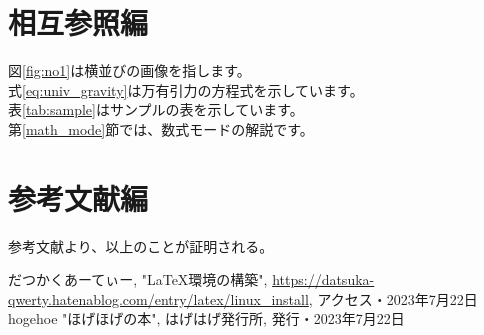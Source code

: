 \documentclass[a4j,uplatex, fleqn]{jsarticle} %
\numberwithin{equation}{section}
\begin{document}
	\section{相互参照編}
		図\ref{fig:no1}は横並びの画像を指します。 \\
		式\ref{eq:univ_gravity}は万有引力の方程式を示しています。\\
		表\ref{tab:sample}はサンプルの表を示しています。 \\
		第\ref{math_mode}節では、数式モードの解説です。
	\section{参考文献編}
		参考文献\cite{my_blog}より、以上のことが証明される。
	\begin{thebibliography}{99}
		 だつかくあーてぃー, "LaTeX環境の構築", \url{https://datsuka-qwerty.hatenablog.com/entry/latex/linux_install}, アクセス・2023年7月22日
		 hogehoe "ほげほげの本", はげはげ発行所, 発行・2023年7月22日
	\end{thebibliography}
\end{document}
